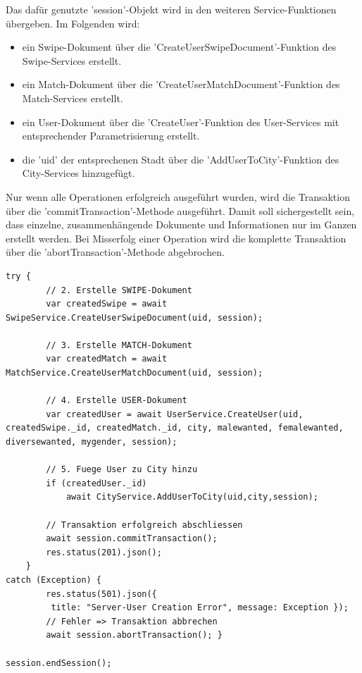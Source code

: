 \noindent
Das dafür genutzte 'session'-Objekt wird in den weiteren Service-Funktionen übergeben. Im Folgenden wird:
\begin{itemize}
\item ein Swipe-Dokument über die 'CreateUserSwipeDocument'-Funktion des Swipe-Services erstellt.
\item ein Match-Dokument über die 'CreateUserMatchDocument'-Funktion des Match-Services erstellt. 
\item ein User-Dokument über die 'CreateUser'-Funktion des User-Services mit entsprechender Parametrisierung erstellt.
\item die 'uid' der entsprechenen Stadt über die 'AddUserToCity'-Funktion des City-Services hinzugefügt.
 \end{itemize}
Nur wenn alle Operationen erfolgreich ausgeführt wurden, wird die Transaktion über die 'commit\-Transaction'-Methode ausgeführt. Damit soll sichergestellt sein, dass einzelne, zusammenhängende Dokumente und Informationen nur im Ganzen erstellt werden. Bei Misserfolg einer Operation wird die komplette Transaktion über die 'abortTransaction'-Methode abgebrochen.

\begin{lstlisting}[caption=UserController - Create User - Dokumente erstellen, label=lst:UserControllerdocumentscreation]
try {
        // 2. Erstelle SWIPE-Dokument
        var createdSwipe = await SwipeService.CreateUserSwipeDocument(uid, session);

        // 3. Erstelle MATCH-Dokument
        var createdMatch = await MatchService.CreateUserMatchDocument(uid, session);

        // 4. Erstelle USER-Dokument
        var createdUser = await UserService.CreateUser(uid, createdSwipe._id, createdMatch._id, city, malewanted, femalewanted, diversewanted, mygender, session);

        // 5. Fuege User zu City hinzu
        if (createdUser._id)
            await CityService.AddUserToCity(uid,city,session);
            
        // Transaktion erfolgreich abschliessen
        await session.commitTransaction();
        res.status(201).json();
    }
catch (Exception) {
        res.status(501).json({
         title: "Server-User Creation Error", message: Exception });
        // Fehler => Transaktion abbrechen
        await session.abortTransaction(); }
        
session.endSession();
\end{lstlisting}
   
